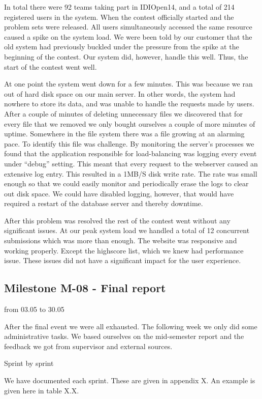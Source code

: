 \bigskip

In total there were 92 teams taking part in IDIOpen14, and a total of
214 registered users in the system. When the contest officially started
and the problem sets were released. All users simultaneously accessed
the same resource caused a spike on the system load. We were been told
by our customer that the old system had previously buckled under the
pressure from the spike at the beginning of the contest. Our system
did, however, handle this well. Thus, the start of the contest went
well. 


\bigskip

At one point the system went down for a few minutes. This was because we
ran out of hard disk space on our main server. In other words, the
system had nowhere to store its data, and was unable to handle the
requests made by users. After a couple of minutes of deleting
unnecessary files we discovered that for every file that we removed we
only bought ourselves a couple of more minutes of uptime. Somewhere in
the file system there was a file growing at an alarming pace. To
identify this file was challenge. By monitoring the
server{\textquoteright}s processes we found that the application
responsible for load-balancing was logging every event under
{\textquotedblleft}debug{\textquotedblright} setting. This meant that
every request to the webserver caused an extensive log entry. This
resulted in a 1MB/S disk write rate. The rate was small enough so that
we could easily monitor and periodically erase the logs to clear out
disk space. We could have disabled logging, however, that would have
required a restart of the database server and thereby downtime. 


\bigskip

After this problem was resolved the rest of the contest went without any
significant issues. At our peak system load we handled a total of 12
concurrent submissions which was more than enough. The website was
responsive and working properly. Except the highscore list, which we
knew had performance issue. These issues did not have a significant
impact for the user experience.


\bigskip

\subsection{Milestone M-08 - Final report}

from 03.05 to 30.05

After the final event we were all exhausted. The following week we only
did some administrative tasks. We based ourselves on the mid-semester
report and the feedback we got from supervisor and external sources. 


\bigskip

Sprint by sprint

We have documented each sprint. These are given in appendix X. An
example is given here in table X.X.\newline

